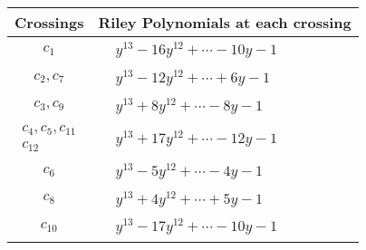 \documentclass[1p]{elsarticle_modified}
\theoremstyle{definition}
\begin{document}
\begin{tabular}{m{50pt}|m{274pt}}
Crossings & \hspace{64pt}Riley Polynomials at each crossing \\
\hline $$\begin{aligned}c_{1}\end{aligned}$$&$\begin{aligned}
&y^{13}-16 y^{12}+\cdots-10 y-1
\end{aligned}$\\
\hline $$\begin{aligned}c_{2},c_{7}\end{aligned}$$&$\begin{aligned}
&y^{13}-12 y^{12}+\cdots+6 y-1
\end{aligned}$\\
\hline $$\begin{aligned}c_{3},c_{9}\end{aligned}$$&$\begin{aligned}
&y^{13}+8 y^{12}+\cdots-8 y-1
\end{aligned}$\\
\hline $$\begin{aligned}c_{4},c_{5},c_{11}\\c_{12}\end{aligned}$$&$\begin{aligned}
&y^{13}+17 y^{12}+\cdots-12 y-1
\end{aligned}$\\
\hline $$\begin{aligned}c_{6}\end{aligned}$$&$\begin{aligned}
&y^{13}-5 y^{12}+\cdots-4 y-1
\end{aligned}$\\
\hline $$\begin{aligned}c_{8}\end{aligned}$$&$\begin{aligned}
&y^{13}+4 y^{12}+\cdots+5 y-1
\end{aligned}$\\
\hline $$\begin{aligned}c_{10}\end{aligned}$$&$\begin{aligned}
&y^{13}-17 y^{12}+\cdots-10 y-1
\end{aligned}$\\
\hline
\end{tabular}\\~\\
\end{document}
